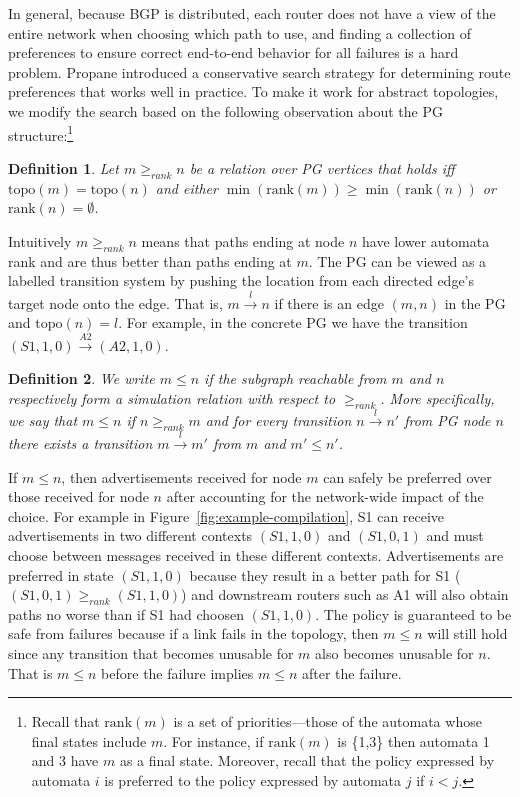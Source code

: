 \documentclass[numbers, 10pt]{sigplanconf}
\newcommand{\Propane}{{\text{}\small \sf Propane}\xspace}
\newcommand{\Topo}[1]{\ensuremath{{\mathrm{topo}}(#1)}}
\newcommand{\Pref}{\ensuremath{\mathrm{rank}}}
\newtheorem{defn}{Definition}[section]
\begin{document}
In general, because BGP is distributed, each router does not have a view of the entire network when choosing which path to use, and finding a collection of preferences to ensure correct end-to-end behavior for all failures is a hard problem. \Propane introduced a conservative search strategy for determining route preferences that works well in practice. To make it work for abstract topologies, we modify the search based on the following observation about the PG structure:\footnote{Recall that $\Pref(m)$ is a set of priorities---those of the
automata whose final states include $m$.  
For instance, if $\Pref(m)$ is \{1,3\} then
automata 1 and 3 have $m$ as a final state.  Moreover, recall that
the policy expressed by automata $i$ is preferred to the policy expressed
by automata $j$ if $i < j$.}

\begin{defn}
Let $m \geq_{rank} n$ be a relation over PG vertices that holds iff $\Topo{m} = \Topo{n}$ and either $\min (\Pref(m)) \geq \min (\Pref(n))$ or $\Pref(n) = \emptyset$.
%
\end{defn}
\noindent
%
Intuitively $m \geq_{rank} n$ means that paths ending at node $n$ have lower automata rank and are thus better than paths ending at $m$.
The PG can be viewed as a labelled transition system by pushing the location from each directed edge's target node onto the edge. That is, $m\overset{l}{\rightarrow}n$ if there is an edge $(m,n)$ in the PG and $\Topo{n} = l$.
%
For example, in the concrete PG we have the transition $(S1,1,0)\overset{A2}{\rightarrow}(A2,1,0)$.

\begin{defn}
We write $m \leq n$ if the subgraph reachable from $m$ and $n$ respectively form a simulation relation with respect to $\geq_{rank}$. More specifically, we say that $m \leq n$ if $n \geq_{rank} m$ and for every transition $n\overset{l}{\rightarrow}n'$ from PG node $n$ there exists a transition $m\overset{l}{\rightarrow}m'$ from $m$ and $m' \leq n'$.
\end{defn}


If $m \leq n$, then advertisements received for node $m$ can safely be preferred over those received for node $n$ after accounting for the network-wide impact of the choice. For example in Figure~\ref{fig:example-compilation}, S1 can receive advertisements in two different contexts $(S1,1,0)$ and $(S1,0,1)$ and must choose between messages received in these different contexts. Advertisements are preferred in state $(S1,1,0)$ because they result in a better path for S1 ($(S1,0,1) \geq_{rank} (S1,1,0)$) and downstream routers such as A1 will also obtain paths no worse than if S1 had choosen $(S1,1,0)$. The policy is guaranteed to be safe from failures because if a link fails in the topology, then $m \leq n$ will still hold since any transition that becomes unusable for $m$ also becomes unusable for $n$. That is $m \leq n$ before the failure implies $m \leq n$ after the failure.
\end{document}
